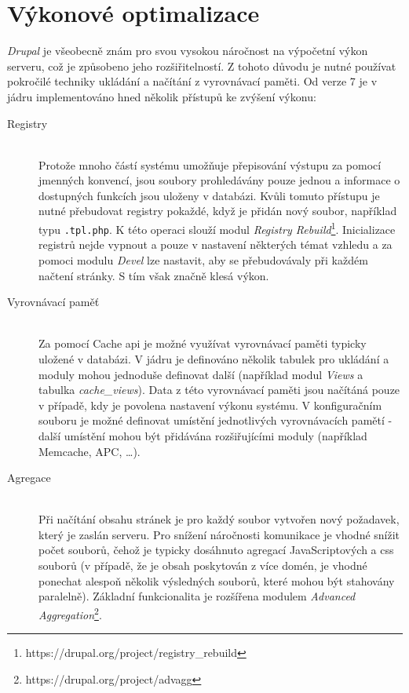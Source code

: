 \section{Výkonové optimalizace}
\emph{Drupal} je všeobecně znám pro svou vysokou náročnost na výpočetní výkon serveru, což je způsobeno jeho rozšiřitelností. Z tohoto důvodu je nutné používat pokročilé techniky ukládání a načítání z vyrovnávací paměti\cite{high-performance-drupal}. Od verze 7 je v jádru implementováno hned několik přístupů ke zvýšení výkonu:

\begin{description}
  \item[Registry] \hfill \\
  Protože mnoho částí systému umožňuje přepisování výstupu za pomocí jmenných konvencí, jsou soubory prohledávány pouze jednou a informace o dostupných funkcích jsou uloženy v databázi. Kvůli tomuto přístupu je nutné přebudovat registry pokaždé, když je přidán nový soubor, například typu \texttt{.tpl.php}. K této operaci slouží modul \emph{Registry Rebuild}\footnote{https://drupal.org/project/registry\_rebuild}. Inicializace registrů nejde vypnout a pouze v nastavení některých témat vzhledu a za pomoci modulu \emph{Devel} lze nastavit, aby se přebudovávaly při každém načtení stránky. S tím však značně klesá výkon.
  \item[Vyrovnávací paměť] \hfill \\
  Za pomocí Cache \gls{api} je možné využívat vyrovnávací paměti typicky uložené v databázi. V jádru je definováno několik tabulek pro ukládání a moduly mohou jednoduše definovat další (například modul \emph{Views} a tabulka \emph{cache\_views}). Data z této vyrovnávací paměti jsou načítáná pouze v případě, kdy je povolena nastavení výkonu systému. V konfiguračním souboru je možné definovat umístění jednotlivých vyrovnávacích pamětí - další umístění mohou být přidávána rozšiřujícími moduly (například Memcache, APC, \dots).
  \item[Agregace] \hfill \\
  Při načítání obsahu stránek je pro každý soubor vytvořen nový požadavek, který je zaslán serveru. Pro snížení náročnosti komunikace je vhodné snížit počet souborů, čehož je typicky dosáhnuto agregací JavaScriptových a \gls{css} souborů (v případě, že je obsah poskytován z více domén, je vhodné ponechat alespoň několik výsledných souborů, které mohou být stahovány paralelně)\cite{website:drupal:optimizing}. Základní funkcionalita je rozšířena modulem \emph{Advanced Aggregation}\footnote{https://drupal.org/project/advagg}.

\end{description}
